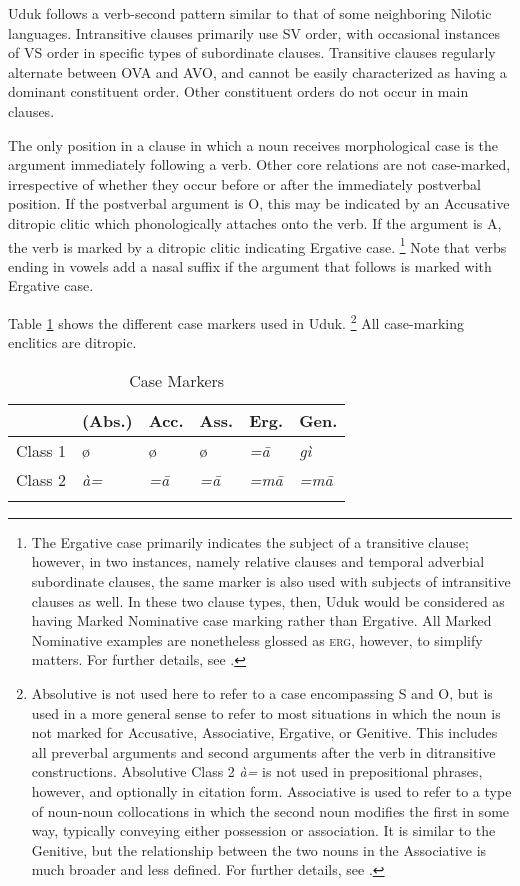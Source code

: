 \documentclass[output=collectionpaper,hidelinks]{langscibook}
\theoremstyle{remark}
\begin{document}
Uduk follows a verb-second pattern similar to that of some neighboring Nilotic
languages. Intransitive clauses primarily use SV order, with occasional
instances of VS order in specific types of subordinate clauses. Transitive
clauses regularly alternate between OVA and AVO, and cannot be easily
characterized as having a dominant constituent order. Other constituent orders
do not occur in main clauses.

The only position in a clause in which a noun receives morphological case is the
argument immediately following a verb. Other core relations are not
case-marked, irrespective of whether they occur before or after the immediately
postverbal position. If the postverbal argument is O, this may be indicated
by an Accusative ditropic clitic which phonologically attaches onto the verb.
If the argument is A, the verb is marked by a ditropic clitic indicating Ergative
case.%
\footnote{The Ergative case primarily indicates the subject of a transitive
clause; however, in two instances, namely relative clauses and temporal
adverbial subordinate clauses, the same marker is also used with subjects of
intransitive clauses as well. In these two clause types, then, Uduk would be
considered as having Marked Nominative case marking rather than Ergative. All
Marked Nominative examples are nonetheless glossed as \textsc{erg}, however, to
simplify matters. For further details, see \citet{Killian2015}.} %
Note
that verbs ending in vowels add a nasal suffix if the argument that follows is
marked with Ergative case.

Table \ref{tab:Don:case_markers} shows the different case markers used in
Uduk.%
\footnote{Absolutive is not used here to refer to a case encompassing S and O,
but is used in a more general sense to refer to most situations in which the
noun is not marked for Accusative, Associative, Ergative, or Genitive.  This
includes all preverbal arguments and second arguments after the verb in
ditransitive constructions.  Absolutive Class 2 \emph{à=} is not used in
prepositional phrases, however, and optionally in citation form.  Associative is
used to refer to a type of noun-noun collocations in which the second noun
modifies the first in some way, typically conveying either possession or
association.  It is similar to the Genitive, but the relationship between the
two nouns in the Associative is much broader and less defined.  For further
details, see \citet{Killian2015}.} %
All case-marking enclitics are ditropic.

\begin{table}[h!]
\centering
\caption{Case Markers}
\label{tab:Don:case_markers}
\begin{tabularx}{.7\textwidth}{lXXXXX}
\lsptoprule
& (Abs.) & Acc. & Ass. & Erg. & Gen. \\
\midrule
Class 1 & ø & ø & ø & \itshape  =ā & \itshape  gì \\
Class 2 &  \itshape à= & \itshape  =ā &  \itshape =ā &  \itshape =mā & \itshape  =mā \\
\lspbottomrule
\end{tabularx}
\end{table}
\end{document}
